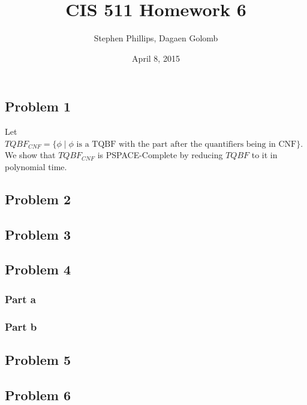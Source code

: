 \documentclass[english]{article}
\title{CIS 511 Homework 6}
\author{Stephen Phillips, Dagaen Golomb}
\date{April 8, 2015}
\begin{document}
\maketitle
\subsection*{Problem 1}
Let $TQBF_{CNF} = \{ \phi \mid \phi \textrm{ is a TQBF with the part after the quantifiers being in CNF} \}$. We show
that $TQBF_{CNF}$ is PSPACE-Complete by reducing $TQBF$ to it in polynomial time.


\subsection*{Problem 2}


\subsection*{Problem 3}

\subsection*{Problem 4}
\subsubsection{Part a}

\subsubsection{Part b}

\subsection*{Problem 5}

\subsection*{Problem 6}
\end{document}
